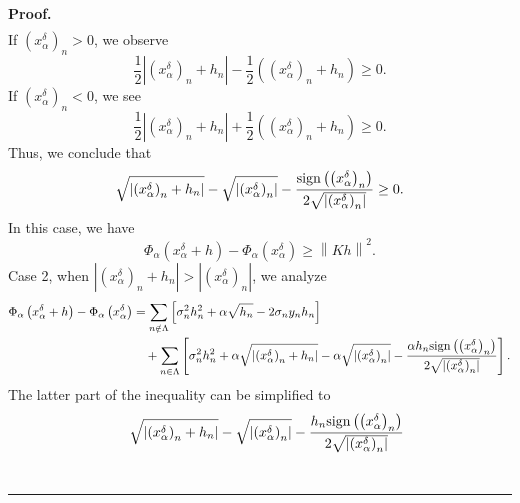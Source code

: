 \documentclass[a4paper,12pt]{article}
\numberwithin{equation}{section}
\newenvironment{proof}[1][Proof]{\textbf{#1.} }
{\ \rule{0.75em}{0.75em}\smallskip}
\begin{document}
\begin{proof}
\begin{align*}
    \end{align*}
    If $\left(x_{\alpha}^{\delta}\right)_{n}>0$, we observe
    \begin{equation*}
        \frac{1}{2}\left|\left(x_{\alpha}^{\delta}\right)_{n}+h_{n}\right|- \frac{1}{2}\left(\left(x_{\alpha}^{\delta}\right)_{n}+h_{n}\right)\geq 0.
    \end{equation*}
    If $\left(x_{\alpha}^{\delta}\right)_{n}<0$, we see
    \begin{equation*}
        \frac{1}{2}\left|\left(x_{\alpha}^{\delta}\right)_{n}+h_{n}\right|+ \frac{1}{2}\left(\left(x_{\alpha}^{\delta}\right)_{n}+h_{n}\right)\geq 0.
    \end{equation*}
    Thus, we conclude that
    \begin{equation*}
        \sqrt{\left|\left(x_{\alpha}^{\delta}\right)_{n}+h_{n}\right|}- \sqrt{\left|\left(x_{\alpha}^{\delta}\right)_{n}\right|}- \frac{{\rm sign} \left(\left(x_{\alpha}^{\delta}\right)_{n}\right)} {2\sqrt{\left|\left(x_{\alpha}^{\delta}\right)_{n}\right|}}\geq 0.
    \end{equation*}
    In this case, we have
    \begin{equation*}
        \Phi_{\alpha}\left(x_{\alpha}^{\delta}+h\right)- \Phi_{\alpha}\left(x_{\alpha}^{\delta}\right)\geq \left\|Kh\right\|^{2}.
    \end{equation*}
    Case 2, when $\left|\left(x_{\alpha}^{\delta}\right)_{n}+h_{n}\right| > \left|\left(x_{\alpha}^{\delta}\right)_{n}\right|$, we analyze
    \begin{align*}
        \Phi_{\alpha}\left(x_{\alpha}^{\delta}+h\right)-\Phi_{\alpha}\left(x_{\alpha}^{\delta}\right)
        & =\sum_{n\notin\Lambda}\left[\sigma_{n}^{2}h_{n}^{2}+\alpha\sqrt{h_{n}}-2\sigma_{n}y_{n}h_{n}\right] \\
        & \quad +\sum_{n\in\Lambda}\left[\sigma_{n}^{2}h_{n}^{2}+ \alpha\sqrt{\left|\left(x_{\alpha}^{\delta}\right)_{n}+h_{n}\right|}- \alpha\sqrt{\left|\left(x_{\alpha}^{\delta}\right)_{n}\right|}- \frac{\alpha h_{n}{\rm sign}\left(\left(x_{\alpha}^{\delta}\right)_{n}\right)} {2\sqrt{\left|\left(x_{\alpha}^{\delta}\right)_{n}\right|}}\right].
    \end{align*}
    The latter part of the inequality can be simplified to
    \begin{align*}
        & \quad \sqrt{\left|\left(x_{\alpha}^{\delta}\right)_{n}+h_{n}\right|}- \sqrt{\left|\left(x_{\alpha}^{\delta}\right)_{n}\right|}- \frac{h_{n}{\rm sign} \left(\left(x_{\alpha}^{\delta}\right)_{n}\right)} {2\sqrt{\left|\left(x_{\alpha}^{\delta}\right)_{n}\right|}} \\

\end{align*}
\end{proof}
\end{document}
